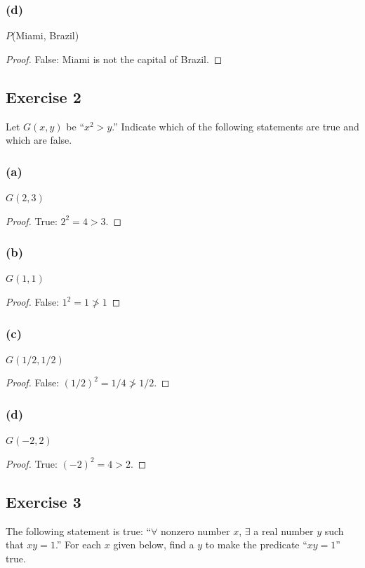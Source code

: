 \documentclass[14pt]{extarticle}
\newcommand{\fa}{\forall}
\newcommand{\te}{\exists}
\begin{document}
\subsubsection{(d)}
$P$(Miami, Brazil)

\begin{proof}
False: Miami is not the capital of Brazil.
\end{proof}

\subsection{Exercise 2}
Let $G(x, y)$ be “$x^2 > y$.” Indicate which of the following statements are true and which are false.

\subsubsection{(a)}
$G(2, 3)$

\begin{proof}
True: $2^2 = 4 > 3$.
\end{proof}

\subsubsection{(b)}
$G(1, 1)$

\begin{proof}
False: $1^2 = 1 \ngtr 1$
\end{proof}

\subsubsection{(c)}
$G(1/2, 1/2)$

\begin{proof}
False: $(1/2)^2 = 1/4 \ngtr 1/2$.
\end{proof}

\subsubsection{(d)}
$G(-2, 2)$

\begin{proof}
True: $(-2)^2 = 4 > 2$.
\end{proof}

\subsection{Exercise 3}
The following statement is true: “$\fa$ nonzero number $x$, $\te$ a real number $y$ such that $xy = 1$.” For each $x$ given below, find a $y$ to make the predicate “$xy = 1$” true.
\end{document}
